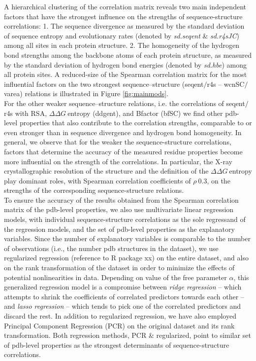 \documentclass[12pt]{article}
\newcommand{\ddg}{$\Delta\Delta G~$}
\begin{document}
        A hierarchical clustering of the correlation matrix reveals two main independent factors that have the strongest influence on the strengths of sequence-structure correlations: 1. The sequence {\color{red} divergence} as measured by the standard deviation of sequence entropy and evolutionary rates (denoted by {\it sd.seqent} \& {\it sd.r4sJC}) among all sites in each protein structure.   2. The homogeneity of the hydrogen bond strengths among the backbone atoms of each protein structure, as measured by the standard deviation of hydrogen bond energies (denoted by {\it sd.hbe}) among all protein sites.   A reduced-size of the Spearman correlation matrix for the most influential factors on the two strongest sequence--structure (seqent$/$r4s -- wcnSC$/$varea) relations is illustrated in Figure \ref{fig:mainmods}.
        \\

        For the other weaker sequence--structure relations, i.e. the correlations of seqent$/$r4s with RSA, \ddg entropy (ddgent), and Bfactor (bfSC) we find other pdb-level properties that also contribute to the correlation strengths, comparable to or even stronger than in sequence divergence and hydrogen bond homogeneity. In general, we observe that for the weaker the sequence-structure correlations, factors that determine the accuracy of the measured residue properties become more influential on the strength of the correlations. In particular, the X-ray crystallographic resolution of the structure and the definition of the \ddg entropy play dominant roles, with Spearman correlation coefficients of $\rho~0.3$, on the strengths of the corresponding sequence-structure relations.
        \\

        To ensure the accuracy of the results obtained from the Spearman correlation matrix of the pdb-level properties, we also use multivariate linear regression models, with individual sequence-structure correlations as the sole regressand of the regression models, and the set of pdb-level properties as the explanatory variables.  Since the number of explanatory variables is comparable to the number of observations (i.e., the number pdb structures in the dataset), we use regularized regression {\color{red}(reference to R package xx)} on the entire dataset, and also on the rank transformation of the dataset in order to minimize the effects of potential nonlinearities in data. Depending on value of the free parameter $\alpha$, this generalized regression model is a compromise between {\it ridge regression} -- which attempts to shrink the coefficients of correlated predictors towards each other -- and {\it lasso regression} -- which tends to pick one of the correlated predictors and discard the rest. In addition to regularized regression, we have also employed Principal Component Regression (PCR) on the original dataset and its rank transformation. Both regression methods, PCR \& regularized, point to similar set of pdb-level properties as the strongest determinants of sequence-structure correlations.
\end{document}
